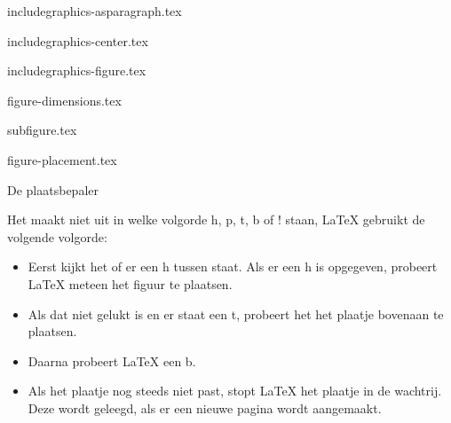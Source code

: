 \documentclass{cursuspresentatie}
\def\importslide#1#2{%
	{#2}
}
\begin{document}
\importslide{images}{includegraphics-asparagraph.tex}
\importslide{images}{includegraphics-center.tex}
\importslide{images}{includegraphics-figure.tex}


\importslide{images}{figure-dimensions.tex}

\importslide{images}{subfigure.tex}

\importslide{images}{figure-placement.tex}

\begin{frame}[allowframebreaks]{De plaatsbepaler}
	
	
	
	Het maakt niet uit in welke volgorde h, p, t, b of ! staan, \LaTeX{} gebruikt de volgende volgorde: 
	\begin{itemize}
		\item Eerst kijkt het of er een h tussen staat. Als er een h is opgegeven, probeert \LaTeX{} meteen het figuur te plaatsen.
		\item Als dat niet gelukt is en er staat een t, probeert het het plaatje bovenaan te plaatsen.
		\item Daarna probeert \LaTeX{} een b.
		\item Als het plaatje nog steeds niet past, stopt \LaTeX{} het plaatje in de wachtrij. Deze wordt geleegd, als er een nieuwe pagina wordt aangemaakt.
	\end{itemize}
	\framebreak
	

\end{frame}
\end{document}
